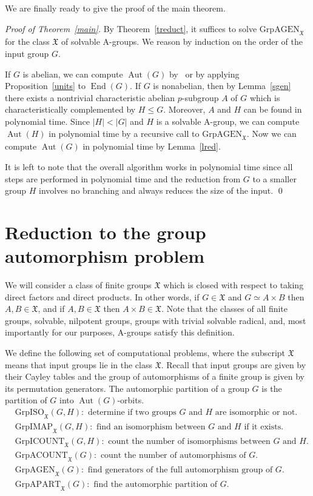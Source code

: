 \documentclass{article}
\DeclareMathOperator{\Aut}{Aut}
\DeclareMathOperator{\End}{End}
\newcommand{\X}{\mathfrak{X}}
\begin{document}
We are finally ready to give the proof of the main theorem.
\medskip

\noindent
\emph{Proof of Theorem~\ref{main}.}
By Theorem~\ref{treduct}, it suffices to solve \( \mathrm{GrpAGEN}_\X \) for the class \( \X \) of solvable A-groups.
We reason by induction on the order of the input group \( G \).

If \( G \) is abelian, we can compute \( \Aut(G) \) by~\cite{absyl} or by applying Proposition~\ref{units} to \( \End(G) \).
If \( G \) is nonabelian, then by Lemma~\ref{sgen} there exists a nontrivial
characteristic abelian \( p \)-subgroup \( A \) of \( G \) which is characteristically complemented by \( H \leq G \).
Moreover, \( A \) and \( H \) can be found in polynomial time. Since \( |H| < |G| \) and \( H \) is a solvable A-group, we can compute \( \Aut(H) \)
in polynomial time by a recursive call to \( \mathrm{GrpAGEN}_\X \). Now we can compute \( \Aut(G) \) in polynomial time by Lemma~\ref{lred}.

It is left to note that the overall algorithm works in polynomial time since all steps are performed in polynomial time
and the reduction from \( G \) to a smaller group \( H \) involves no branching and always reduces the size of the input.
\qed

\section{Reduction to the group automorphism problem}\label{secAut}

We will consider a class of finite groups \( \X \) which is closed with respect to
taking direct factors and direct products. In other words, if \( G \in \X \)
and \( G \simeq A \times B \) then \( A, B \in \X \), and if \( A, B \in \X \) then \( A \times B \in \X \).
Note that the classes of all finite groups, solvable, nilpotent groups,
groups with trivial solvable radical, and, most importantly for our purposes, A-groups satisfy this definition.

We define the following set of computational problems, where the subscript \( \X \) means that input groups lie in the class \( \X \).
Recall that input groups are given by their Cayley tables and the group of automorphisms of a finite group is given by its permutation generators.
The automorphic partition of a group \( G \) is the partition of \( G \) into \( \Aut(G) \)-orbits.
\begin{align*}
	&\mathrm{GrpISO}_\X(G, H): \text{ determine if two groups } G \text{ and } H \text{ are isomorphic or not.}\\
	&\mathrm{GrpIMAP}_\X(G, H): \text{ find an isomorphism between } G \text{ and } H \text{ if it exists.}\\
	&\mathrm{GrpICOUNT}_\X(G, H): \text{ count the number of isomorphisms between } G \text{ and } H.\\
	&\mathrm{GrpACOUNT}_\X(G): \text{ count the number of automorphisms of } G.\\
	&\mathrm{GrpAGEN}_\X(G): \text{ find generators of the full automorphism group of } G.\\
	&\mathrm{GrpAPART}_\X(G): \text{ find the automorphic partition of } G.
\end{align*}
\end{document}
